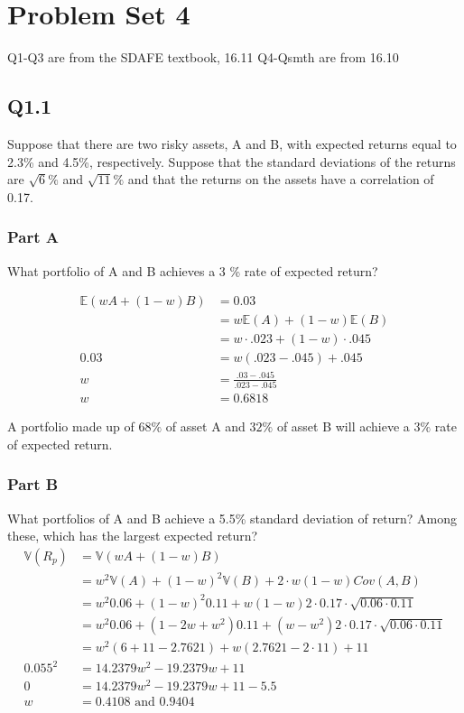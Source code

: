 \documentclass[
  oneside]{book}
\begin{document}
\hypertarget{problem-set-4}{%
\chapter{Problem Set 4}\label{problem-set-4}}

Q1-Q3 are from the SDAFE textbook, 16.11
Q4-Qsmth are from 16.10

\hypertarget{q1.1}{%
\section{Q1.1}\label{q1.1}}

Suppose that there are two risky assets, A and B, with expected returns equal to 2.3\% and 4.5\%, respectively. Suppose that the standard deviations of the returns are \(\sqrt{ 6 }\%\) and \(\sqrt{ 11 }\%\) and that the returns on the assets have a correlation of 0.17.

\hypertarget{part-a-5}{%
\subsection{Part A}\label{part-a-5}}

What portfolio of A and B achieves a 3 \% rate of expected return?

\[
\begin{aligned}
\mathbb{E}(wA+ (1-w)B) &= 0.03\\
&= w\mathbb{E}(A) + (1-w)\mathbb{E}(B)\\
&= w\cdot .023 + (1-w)\cdot.045\\
0.03 &= w(.023-.045) + .045\\
w &= \frac{.03-.045}{.023-.045}\\
w &= 0.6818
\end{aligned}
\]

A portfolio made up of \(68\%\) of asset A and \(32\%\) of asset B will achieve a \(3\%\) rate of expected return.

\hypertarget{part-b-5}{%
\subsection{Part B}\label{part-b-5}}

What portfolios of A and B achieve a 5.5\% standard deviation of return? Among these, which has the largest expected return?
\[
\begin{aligned}
\mathbb{V}(R_{p}) &= \mathbb{V}(wA + (1-w)B)\\
&= w^{2}\mathbb{V}(A) + (1-w)^{2}\mathbb{V}(B) + 2\cdot w(1-w)Cov(A,B)\\
&= w^{2}0.06 + (1-w)^{2}0.11 + w(1-w) 2\cdot0.17\cdot \sqrt{  0.06 \cdot 0.11}\\
&= w^{2}0.06 + (1-2w+w^{2})0.11 + (w-w^{2}) 2\cdot 0.17\cdot \sqrt{  0.06 \cdot 0.11}\\
&= w^{2}(6 + 11 - 2.7621) + w(2.7621 -2\cdot 11) + 11\\
0.055^{2} &= 14.2379w^{2} -19.2379 w + 11\\
0 &= 14.2379w^{2} -19.2379 w + 11 - 5.5\\
w &= 0.4108 \text{ and } 0.9404
\end{aligned}
\]
\end{document}
